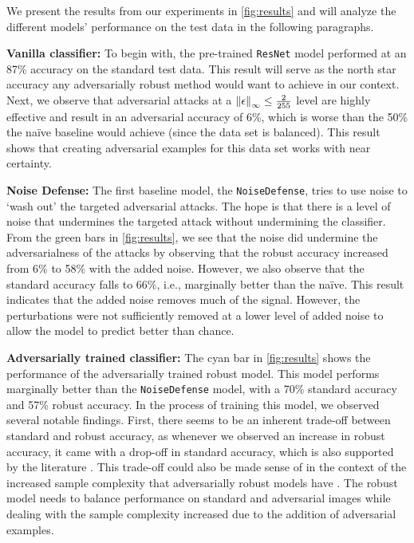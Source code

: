 \documentclass[twocolumn]{article}
\begin{document}
We present the results from our experiments in \autoref{fig:results} and will analyze the different models' performance on the test data in the following paragraphs.

\textbf{Vanilla classifier:}
To begin with, the pre-trained \texttt{ResNet} model performed at an 87\% accuracy on the standard test data. This result will serve as the north star accuracy any adversarially robust method would want to achieve in our context. Next, we observe that adversarial attacks at a $\norm{\epsilon}_\infty\leq\frac{2}{255}$ level are highly effective and result in an adversarial accuracy of 6\%, which is worse than the 50\% the naïve baseline would achieve (since the data set is balanced). This result shows that creating adversarial examples for this data set works with near certainty.


\textbf{Noise Defense:}
The first baseline model, the \texttt{NoiseDefense}, tries to use noise to `wash out' the targeted adversarial attacks. The hope is that there is a level of noise that undermines the targeted attack without undermining the classifier. From the green bars in \autoref{fig:results}, we see that the noise did undermine the adversarialness of the attacks by observing that the robust accuracy increased from 6\% to 58\% with the added noise. However, we also observe that the standard accuracy falls to 66\%, i.e., marginally better than the naïve. This result indicates that the added noise removes much of the signal. However, the perturbations were not sufficiently removed at a lower level of added noise to allow the model to predict better than chance.


\textbf{Adversarially trained classifier:}
The cyan bar in \autoref{fig:results} shows the performance of the adversarially trained robust model. This model performs marginally better than the \texttt{NoiseDefense} model, with a 70\% standard accuracy and 57\% robust accuracy. In the process of training this model, we observed several notable findings. First, there seems to be an inherent trade-off between standard and robust accuracy, as whenever we observed an increase in robust accuracy, it came with a drop-off in standard accuracy, which is also supported by the literature \cite{raghunathan2020understanding}. This trade-off could also be made sense of in the context of the increased sample complexity that adversarially robust models have \cite{schmidt2018adversarially}. The robust model needs to balance performance on standard and adversarial images while dealing with the sample complexity increased due to the addition of adversarial examples.
\end{document}
